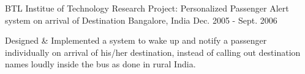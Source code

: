\begin{cventries}
  \cventry
    {BTL Institue of Technology} %
    {Research Project: Personalized Passenger Alert system on arrival of Destination} %
    {Bangalore, India} %
    {Dec. 2005 - Sept. 2006} %
    {
      \begin{cvitems} %
      	\item {Designed \& Implemented a system to wake up and notify a passenger individually on arrival of his/her destination, instead of calling out destination names loudly inside the bus as done in rural India.}
      \end{cvitems}
    }
    
\end{cventries}
